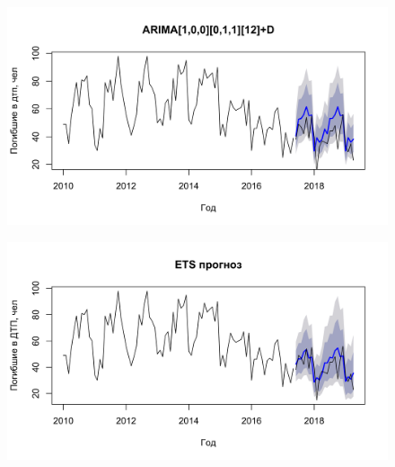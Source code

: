 \documentclass[14pt, a4paper]{extarticle}\usepackage[]{graphicx}\usepackage[]{color}
\makeatletter
\def\maxwidth{ %
  \ifdim\Gin@nat@width>\linewidth
    \linewidth
  \else
    \Gin@nat@width
  \fi
}
\newenvironment{knitrout}{}{} %
\makeatother
\begin{document}
\begin{minipage}[t]{0.5\textwidth}
\begin{figure}[H]
\begin{knitrout}
\color{fgcolor}

{\centering \includegraphics[width=\maxwidth]{figure/unnamed-chunk-17-1} 

}



\end{knitrout}
\end{figure}
\end{minipage}

\begin{minipage}[t]{0.5\textwidth}
\begin{figure}[H]
\begin{knitrout}
\color{fgcolor}

{\centering \includegraphics[width=\maxwidth]{figure/unnamed-chunk-18-1} 

}



\end{knitrout}
\end{figure}
\end{minipage}
\end{document}
